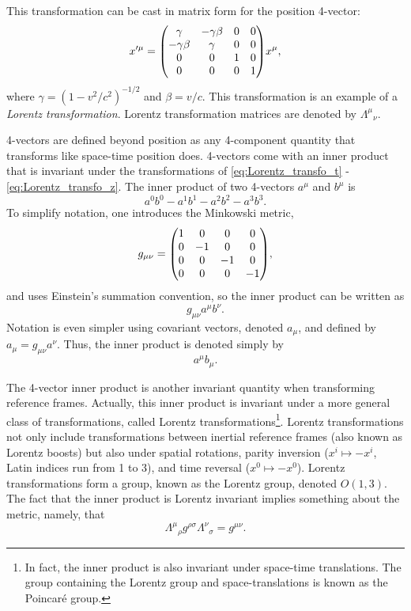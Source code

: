 This transformation can be cast in matrix form for the position 4-vector: $$x'^{\mu} = \mqty(\gamma & -\gamma\beta & 0 & 0 \\ -\gamma\beta & \gamma & 0 & 0 \\ 0 & 0 & 1 &0 \\ 0 & 0 & 0 & 1)x^\mu, $$ where $\gamma = (1-v^2/c^2)^{-1/2}$ and $\beta = v/c$. This transformation is an example of a \textit{Lorentz transformation}. Lorentz transformation matrices are denoted by ${\Lambda^{\mu}}_{\nu}$.

4-vectors are defined beyond position as any 4-component quantity that transforms like space-time position does. 4-vectors come with an inner product that is invariant under the transformations of \eqref{eq:Lorentz_transfo_t} - \eqref{eq:Lorentz_transfo_z}. The inner product of two 4-vectors $a^\mu$ and $b^\mu$ is $$ a^0b^0-a^1b^1-a^2b^2-a^3b^3.$$ To simplify notation, one introduces the Minkowski metric, $$ g_{\mu\nu} = \mqty(\dmat[0]{1,-1,-1,-1}),$$ and uses Einstein's summation convention, so the inner product can be written as $$g_{\mu\nu} a^\mu b^\nu.$$ Notation is even simpler using covariant vectors, denoted $a_\mu$, and defined by $a_\mu = g_{\mu\nu}a^\nu$. Thus, the inner product is denoted simply by 
\begin{equation}
    a^{\mu}b_{\mu}.
\end{equation}

The 4-vector inner product is another invariant quantity when transforming reference frames. Actually, this inner product is invariant under a more general class of transformations, called Lorentz transformations\footnote{In fact, the inner product is also invariant under space-time translations. The group containing the Lorentz group and space-translations is known as the Poincaré group.}. Lorentz transformations not only include transformations between inertial reference frames (also known as Lorentz boosts) but also under spatial rotations, parity inversion ($x^i \mapsto -x^i$, Latin indices run from 1 to 3), and time reversal ($x^0\mapsto -x^0$). Lorentz transformations form a group, known as the Lorentz group, denoted $O(1,3)$. The fact that the inner product is Lorentz invariant implies something about the metric, namely, that \begin{equation}\label{eq:metric_Lorentz_trans}
    {\Lambda^\mu}_{\rho} g^{\rho\sigma} {\Lambda^{\nu}}_{\sigma} = g^{\mu\nu}.
\end{equation}

